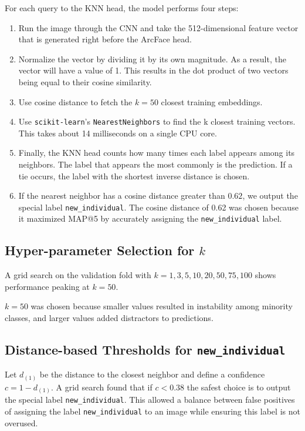 \documentclass[twocolumn]{article}
\begin{document}
For each query to the KNN head, the model performs four steps:
\begin{enumerate}
    \item Run the image through the CNN and take the 512-dimensional feature vector that is generated right before the ArcFace head.
    \item Normalize the vector by dividing it by its own magnitude. As a result, the vector will have a value of 1. This results in the dot product of two vectors being equal to their cosine similarity.
    \item Use cosine distance to fetch the $k=50$ closest training embeddings.
    \item Use \texttt{scikit-learn}'s \texttt{NearestNeighbors} to find the k closest training vectors. This takes about 14 milliseconds on a single CPU core.
    \item Finally, the KNN head counts how many times each label appears among its neighbors.  The label that appears the most commonly is the prediction. If a tie occurs, the label with the shortest inverse distance is chosen.
    \item If the nearest neighbor has a cosine distance greater than $0.62$, we output the special label \texttt{new\_individual}. The cosine distance of 0.62 was chosen because it maximized MAP@5 by accurately assigning the \texttt{new\_individual} label.
\end{enumerate}

\subsection{Hyper-parameter Selection for $k$}

A grid search on the validation fold with $k\!=\!1,3,5,10,20,50,75,100$ shows performance peaking at $k=50$. 

$k=50$ was chosen because smaller values resulted in instability among minority classes, and larger values added distractors to predictions.

\subsection{Distance-based Thresholds for \texttt{new\_individual}}

Let $d_{(1)}$ be the distance to the closest neighbor and define a confidence $c = 1 - d_{(1)}$.
A grid search found that if $c < 0.38$ the safest choice is to output the special label \texttt{new\_individual}.
This allowed a balance between false positives of assigning the label \texttt{new\_individual} to an image while ensuring this label is not overused.
\end{document}
